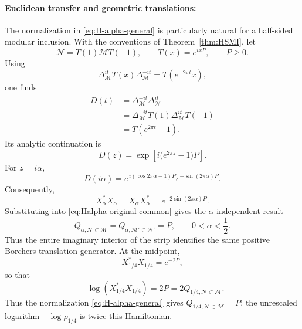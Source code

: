 \documentclass[a4paper,11pt]{article}
\theoremstyle{definition}
\newcommand{\mN}{\mathcal{N}}
\newcommand{\mM}{\mathcal{M}}
\begin{document}
\paragraph{Euclidean transfer and geometric translations:} The normalization in \eqref{eq:H-alpha-general} is particularly natural for
a half-sided modular inclusion. With the conventions of
Theorem~\ref{thm:HSMI}, let
\begin{equation}
    \mN
    =
    T(1)\mM T(-1),
    \qquad
    T(x)=e^{ixP},
    \qquad
    P\geq0 .
\end{equation}
Using
\begin{equation}
    \Delta_{\mM}^{it}
    T(x)
    \Delta_{\mM}^{-it}
    =
    T(e^{-2\pi t}x),
\end{equation}
one finds
\begin{align}
    D(t)
    &=
    \Delta_{\mM}^{-it}\Delta_{\mN}^{it}
    \nonumber\\
    &=
    \Delta_{\mM}^{-it}
    T(1)\Delta_{\mM}^{it}T(-1)
    \nonumber\\
    &=
    T(e^{2\pi t}-1).
    \label{eq:D-HSMI-explicit}
\end{align}
Its analytic continuation is
\begin{equation}
    D(z)
    =
    \exp\left[
        i\bigl(e^{2\pi z}-1\bigr)P
    \right].
    \label{eq:D-HSMI-complex}
\end{equation}
For $z=i\alpha$,
\begin{equation}
    D(i\alpha)
    =
    e^{\,i(\cos 2\pi\alpha-1)P}
    e^{-\sin(2\pi\alpha)P}.
\end{equation}
Consequently,
\begin{equation}
    X_\alpha^*X_\alpha
    =
    X_\alpha X_\alpha^*
    =
    e^{-2\sin(2\pi\alpha)P}.
    \label{eq:rho-HSMI-alpha}
\end{equation}
Substituting into \eqref{eq:Halpha-original-common} gives the
$\alpha$-independent result
\begin{equation}
    \boxed{
    Q_{\alpha,\mN\subset\mM}
    =
    Q_{\alpha,\mM'\subset\mN'}
    =
    P,
    \qquad
    0<\alpha<\frac12 .
    }
    \label{eq:Halpha-HSMI-P}
\end{equation}
Thus the entire imaginary interior of the strip identifies the same positive
Borchers translation generator. At the midpoint,
\begin{equation}
    X_{1/4}^*X_{1/4}=e^{-2P},
\end{equation}
so that
\begin{equation}
    -\log(X_{1/4}^*X_{1/4})=2P=2Q_{1/4,\mN\subset\mM}.
\end{equation}
Thus the normalization \eqref{eq:H-alpha-general} gives
$Q_{1/4,\mN\subset\mM}=P$; the unrescaled logarithm $-\log\rho_{1/4}$ is twice
this Hamiltonian.
\end{document}
